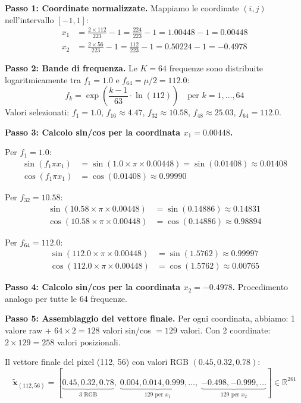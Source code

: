 \documentclass[12pt,a4paper]{article}
\begin{document}
\begin{examplebox}
\textbf{Passo 1: Coordinate normalizzate.} Mappiamo le coordinate $(i, j)$ nell'intervallo $[-1, 1]$:
\begin{align*}
    x_1 &= \frac{2 \times 112}{223} - 1 = \frac{224}{223} - 1 = 1.00448 - 1 = 0.00448 \\
    x_2 &= \frac{2 \times 56}{223} - 1 = \frac{112}{223} - 1 = 0.50224 - 1 = -0.4978
\end{align*}

\textbf{Passo 2: Bande di frequenza.} Le $K = 64$ frequenze sono distribuite logaritmicamente tra $f_1 = 1.0$ e $f_{64} = \mu / 2 = 112.0$:
\[
    f_k = \exp\!\left(\frac{k-1}{63} \cdot \ln(112)\right) \quad \text{per } k = 1, \ldots, 64
\]
Valori selezionati: $f_1 = 1.0$, $f_{16} \approx 4.47$, $f_{32} \approx 10.58$, $f_{48} \approx 25.03$, $f_{64} = 112.0$.

\textbf{Passo 3: Calcolo sin/cos per la coordinata $x_1 = 0.00448$.}

Per $f_1 = 1.0$:
\begin{align*}
    \sin(f_1 \pi x_1) &= \sin(1.0 \times \pi \times 0.00448) = \sin(0.01408) \approx 0.01408 \\
    \cos(f_1 \pi x_1) &= \cos(0.01408) \approx 0.99990
\end{align*}

Per $f_{32} = 10.58$:
\begin{align*}
    \sin(10.58 \times \pi \times 0.00448) &= \sin(0.14886) \approx 0.14831 \\
    \cos(10.58 \times \pi \times 0.00448) &= \cos(0.14886) \approx 0.98894
\end{align*}

Per $f_{64} = 112.0$:
\begin{align*}
    \sin(112.0 \times \pi \times 0.00448) &= \sin(1.5762) \approx 0.99997 \\
    \cos(112.0 \times \pi \times 0.00448) &= \cos(1.5762) \approx 0.00765
\end{align*}

\textbf{Passo 4: Calcolo sin/cos per la coordinata $x_2 = -0.4978$.} Procedimento analogo per tutte le 64 frequenze.

\textbf{Passo 5: Assemblaggio del vettore finale.} Per ogni coordinata, abbiamo: 1 valore raw + $64 \times 2 = 128$ valori sin/cos $= 129$ valori. Con 2 coordinate: $2 \times 129 = 258$ valori posizionali.

Il vettore finale del pixel (112, 56) con valori RGB $(0.45, 0.32, 0.78)$:
\[
    \tilde{\mathbf{x}}_{(112,56)} = [\underbrace{0.45, 0.32, 0.78}_{3\text{ RGB}},\;
    \underbrace{0.004, 0.014, 0.999, \ldots}_{129\text{ per }x_1},\;
    \underbrace{-0.498, -0.999, \ldots}_{129\text{ per }x_2}] \in \mathbb{R}^{261}
\]
\end{examplebox}
\end{document}
